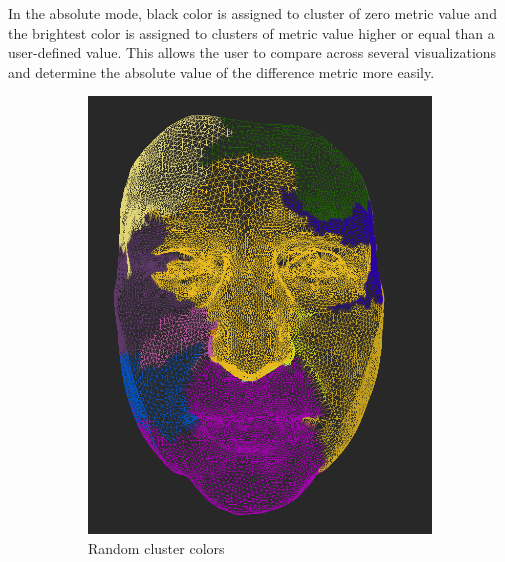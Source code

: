 In the absolute mode, black color is assigned to cluster of zero metric value and the brightest color is assigned to clusters of metric value higher or equal than a user-defined value. This allows the user to compare across several visualizations and determine the absolute value of the difference metric more easily.

\begin{figure}[h]
\centering
	\begin{subfigure}{0.3\textwidth}
	\includegraphics[width=\textwidth]{./img/meshdiff-clustercolor-random.PNG}
    \caption{Random cluster colors}
    \label{fig:meshdiff_clustercolor_random}
	\end{subfigure}
    \qquad
    \begin{subfigure}{0.3\textwidth}

\end{subfigure}
\end{figure}

